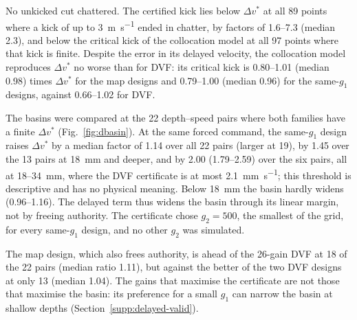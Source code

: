 No unkicked cut chattered. The certified kick lies below $\Delta v^*$ at all 89 points where a kick of up to \SI{3}{\metre\per\second} ended in chatter, by factors of 1.6--7.3 (median 2.3), and below the critical kick of the collocation model at all 97 points where that kick is finite. Despite the error in its delayed velocity, the collocation model reproduces $\Delta v^*$ no worse than for DVF: its critical kick is 0.80--1.01 (median 0.98) times $\Delta v^*$ for the map designs and 0.79--1.00 (median 0.96) for the same-$g_1$ designs, against 0.66--1.02 for DVF.

The basins were compared at the 22 depth--speed pairs where both families have a finite $\Delta v^*$ (Fig.~\ref{fig:dbasin}). At the same forced command, the same-$g_1$ design raises $\Delta v^*$ by a median factor of 1.14 over all 22 pairs (larger at 19), by 1.45 over the 13 pairs at \SI{18}{\milli\metre} and deeper, and by 2.00 (1.79--2.59) over the six pairs, all at 18--\SI{34}{\milli\metre}, where the DVF certificate is at most \SI{2.1}{\milli\metre\per\second}; this threshold is descriptive and has no physical meaning. Below \SI{18}{\milli\metre} the basin hardly widens (0.96--1.16). The delayed term thus widens the basin through its linear margin, not by freeing authority. The certificate chose $g_2=500$, the smallest of the grid, for every same-$g_1$ design, and no other $g_2$ was simulated.

The map design, which also frees authority, is ahead of the 26-gain DVF at 18 of the 22 pairs (median ratio 1.11), but against the better of the two DVF designs at only 13 (median 1.04). The gains that maximise the certificate are not those that maximise the basin: its preference for a small $g_1$ can narrow the basin at shallow depths (Section~\ref{supp:delayed-valid}).

